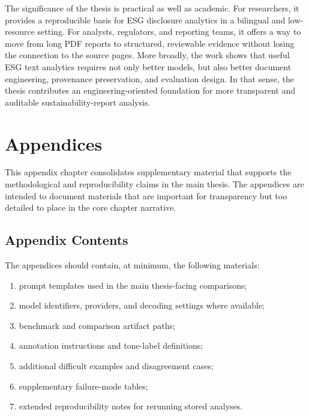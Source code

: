 \documentclass[english, online, cse, master]{dithesis}
\providecommand{\tightlist}{\setlength{\itemsep}{0pt}\setlength{\parskip}{0pt}}
\begin{document}
The significance of the thesis is practical as well as academic. For researchers, it provides a reproducible basis for ESG disclosure analytics in a bilingual and low-resource setting. For analysts, regulators, and reporting teams, it offers a way to move from long PDF reports to structured, reviewable evidence without losing the connection to the source pages. More broadly, the work shows that useful ESG text analytics requires not only better models, but also better document engineering, provenance preservation, and evaluation design. In that sense, the thesis contributes an engineering-oriented foundation for more transparent and auditable sustainability-report analysis.     
\printbibliography[heading=bibnumbered, title=\mybibname]

\startappendix
\chapter{Appendices}
  































This appendix chapter consolidates supplementary material that supports the methodological and reproducibility claims in the main thesis. The appendices are intended to document materials that are important for transparency but too detailed to place in the core chapter narrative.

\section{Appendix Contents}\label{appendix-contents}

The appendices should contain, at minimum, the following materials:

\begin{enumerate}
\def\labelenumi{\arabic{enumi}.}
\tightlist
\item
  prompt templates used in the main thesis-facing comparisons;
\item
  model identifiers, providers, and decoding settings where available;
\item
  benchmark and comparison artifact paths;
\item
  annotation instructions and tone-label definitions;
\item
  additional difficult examples and disagreement cases;
\item
  supplementary failure-mode tables;
\item
  extended reproducibility notes for rerunning stored analyses.
\end{enumerate}
\end{document}
